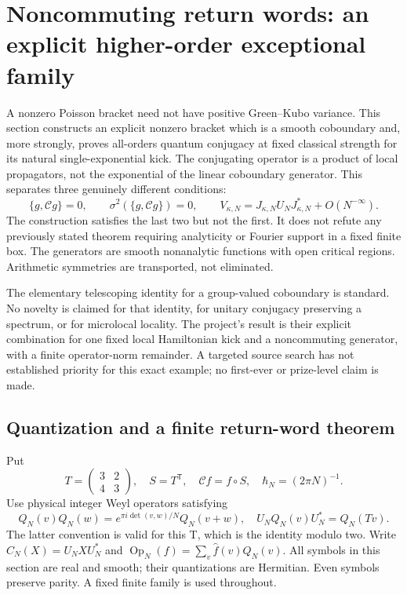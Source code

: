 \section{Noncommuting return words: an explicit higher-order exceptional family}\label{sec:return_words}
A nonzero Poisson bracket need not have positive Green--Kubo variance. This section constructs an explicit nonzero bracket which is a smooth coboundary and, more strongly, proves all-orders quantum conjugacy at fixed classical strength for its natural single-exponential kick. The conjugating operator is a product of local propagators, not the exponential of the linear coboundary generator. This separates three genuinely different conditions: \[
\{g,\mathcal Cg\}=0,
\qquad \sigma^2(\{g,\mathcal Cg\})=0,
\qquad V_{\kappa,N}=J_{\kappa,N}U_NJ_{\kappa,N}^*+O(N^{-\infty}).
\] The construction satisfies the last two but not the first. It does not refute any previously stated theorem requiring analyticity or Fourier support in a fixed finite box. The generators are smooth nonanalytic functions with open critical regions. Arithmetic symmetries are transported, not eliminated.

The elementary telescoping identity for a group-valued coboundary is standard. No novelty is claimed for that identity, for unitary conjugacy preserving a spectrum, or for microlocal locality. The project's result is their explicit combination for one fixed local Hamiltonian kick and a noncommuting generator, with a finite operator-norm remainder. A targeted source search has not established priority for this exact example; no first-ever or prize-level claim is made.

\subsection{Quantization and a finite return-word theorem}\label{return_words:quantization-and-a-finite-return-word-theorem}

Put \[
 T=\begin{pmatrix}3&2\\4&3\end{pmatrix},\quad S=T^{\mathsf T},
 \quad \mathcal Cf=f\circ S,\quad \hbar_N=(2\pi N)^{-1}.
\] Use physical integer Weyl operators satisfying \[
 Q_N(v)Q_N(w)=e^{\pi i\det(v,w)/N}Q_N(v+w),\quad
 U_NQ_N(v)U_N^*=Q_N(Tv).
\] The latter convention is valid for this T, which is the identity modulo two. Write \(C_N(X)=U_NXU_N^*\) and \(\operatorname{Op}_N(f)=\sum_v\widehat f(v)Q_N(v)\). All symbols in this section are real and smooth; their quantizations are Hermitian. Even symbols preserve parity. A fixed finite family is used throughout.

